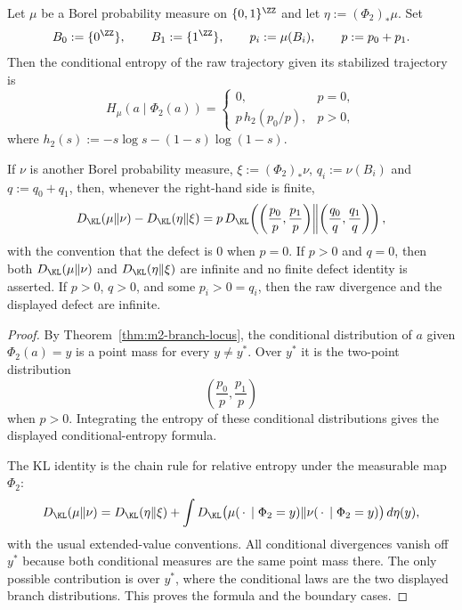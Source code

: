 \begin{corollary}\label{cor:m2-defect-formulas}
Let $\mu$ be a Borel probability measure on $\{0,1\}^{\ZZ}$ and let
$\eta:=(\Phi_2)_*\mu$.  Set
\[
B_0:=\{0^{\ZZ}\},\qquad B_1:=\{1^{\ZZ}\},\qquad
p_i:=\mu(B_i),\qquad p:=p_0+p_1.
\]
Then the conditional entropy of the raw trajectory given its stabilized
trajectory is
\[
H_\mu(a\mid \Phi_2(a))=
\begin{cases}
0, & p=0,\\[1mm]
p\,h_2(p_0/p), & p>0,
\end{cases}
\]
where $h_2(s):=-s\log s-(1-s)\log(1-s)$.

If $\nu$ is another Borel probability measure, $\xi:=(\Phi_2)_*\nu$,
$q_i:=\nu(B_i)$ and $q:=q_0+q_1$, then, whenever the right-hand side is finite,
\[
D_{\KL}(\mu\|\nu)-D_{\KL}(\eta\|\xi)
=
p\,D_{\KL}\!\left(
\left(\frac{p_0}{p},\frac{p_1}{p}\right)
\middle\|
\left(\frac{q_0}{q},\frac{q_1}{q}\right)
\right),
\]
with the convention that the defect is $0$ when $p=0$.  If $p>0$ and $q=0$,
then both $D_{\KL}(\mu\|\nu)$ and $D_{\KL}(\eta\|\xi)$ are infinite and no
finite defect identity is asserted.  If $p>0$, $q>0$, and some $p_i>0=q_i$,
then the raw divergence and the displayed defect are infinite.
\end{corollary}

\begin{proof}
By Theorem~\ref{thm:m2-branch-locus}, the conditional distribution of $a$
given $\Phi_2(a)=y$ is a point mass for every $y\ne y^\ast$.  Over
$y^\ast$ it is the two-point distribution
\[
\left(\frac{p_0}{p},\frac{p_1}{p}\right)
\]
when $p>0$.  Integrating the entropy of these conditional distributions gives
the displayed conditional-entropy formula.

The KL identity is the chain rule for relative entropy under the measurable
map $\Phi_2$:
\[
D_{\KL}(\mu\|\nu)
=D_{\KL}(\eta\|\xi)
+\int D_{\KL}\bigl(\mu(\,\cdot\,\mid \Phi_2=y)\|
\nu(\,\cdot\,\mid \Phi_2=y)\bigr)\,d\eta(y),
\]
with the usual extended-value conventions.  All conditional divergences vanish
off $y^\ast$ because both conditional measures are the same point mass there.
The only possible contribution is over $y^\ast$, where the conditional laws
are the two displayed branch distributions.  This proves the formula and the
boundary cases.
\end{proof}

